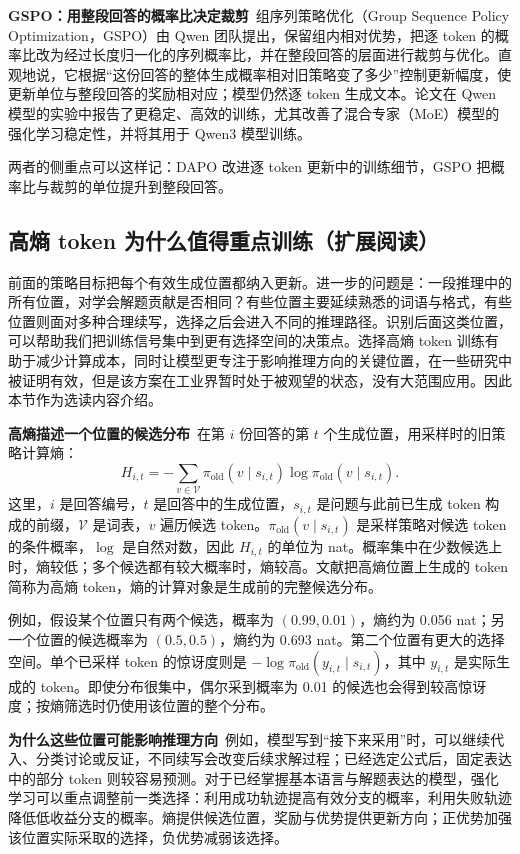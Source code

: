 \textbf{GSPO：用整段回答的概率比决定裁剪}~组序列策略优化（Group Sequence Policy Optimization，GSPO）由 Qwen 团队提出，保留组内相对优势，把逐 token 的概率比改为经过长度归一化的序列概率比，并在整段回答的层面进行裁剪与优化。直观地说，它根据``这份回答的整体生成概率相对旧策略变了多少''控制更新幅度，使更新单位与整段回答的奖励相对应；模型仍然逐 token 生成文本。论文在 Qwen 模型的实验中报告了更稳定、高效的训练，尤其改善了混合专家（MoE）模型的强化学习稳定性，并将其用于 Qwen3 模型训练。

两者的侧重点可以这样记：DAPO 改进逐 token 更新中的训练细节，GSPO 把概率比与裁剪的单位提升到整段回答。

\subsection{高熵 token 为什么值得重点训练（扩展阅读）}

前面的策略目标把每个有效生成位置都纳入更新。进一步的问题是：一段推理中的所有位置，对学会解题贡献是否相同？有些位置主要延续熟悉的词语与格式，有些位置则面对多种合理续写，选择之后会进入不同的推理路径。识别后面这类位置，可以帮助我们把训练信号集中到更有选择空间的决策点。选择高熵 token 训练有助于减少计算成本，同时让模型更专注于影响推理方向的关键位置，在一些研究中被证明有效，但是该方案在工业界暂时处于被观望的状态，没有大范围应用。因此本节作为选读内容介绍。

\textbf{高熵描述一个位置的候选分布}~在第 $i$ 份回答的第 $t$ 个生成位置，用采样时的旧策略计算熵：
\[
H_{i,t}=-\sum_{v\in\mathcal V}
\pi_{\mathrm{old}}(v\mid s_{i,t})
\log\pi_{\mathrm{old}}(v\mid s_{i,t}).
\]
这里，$i$ 是回答编号，$t$ 是回答中的生成位置，$s_{i,t}$ 是问题与此前已生成 token 构成的前缀，$\mathcal V$ 是词表，$v$ 遍历候选 token。$\pi_{\mathrm{old}}(v\mid s_{i,t})$ 是采样策略对候选 token 的条件概率，$\log$ 是自然对数，因此 $H_{i,t}$ 的单位为 nat。概率集中在少数候选上时，熵较低；多个候选都有较大概率时，熵较高。文献把高熵位置上生成的 token 简称为高熵 token，熵的计算对象是生成前的完整候选分布。

例如，假设某个位置只有两个候选，概率为 $(0.99,0.01)$，熵约为 0.056 nat；另一个位置的候选概率为 $(0.5,0.5)$，熵约为 0.693 nat。第二个位置有更大的选择空间。单个已采样 token 的惊讶度则是 $-\log\pi_{\mathrm{old}}(y_{i,t}\mid s_{i,t})$，其中 $y_{i,t}$ 是实际生成的 token。即使分布很集中，偶尔采到概率为 0.01 的候选也会得到较高惊讶度；按熵筛选时仍使用该位置的整个分布。

\textbf{为什么这些位置可能影响推理方向}~例如，模型写到``接下来采用''时，可以继续代入、分类讨论或反证，不同续写会改变后续求解过程；已经选定公式后，固定表达中的部分 token 则较容易预测。对于已经掌握基本语言与解题表达的模型，强化学习可以重点调整前一类选择：利用成功轨迹提高有效分支的概率，利用失败轨迹降低低收益分支的概率。熵提供候选位置，奖励与优势提供更新方向；正优势加强该位置实际采取的选择，负优势减弱该选择。

